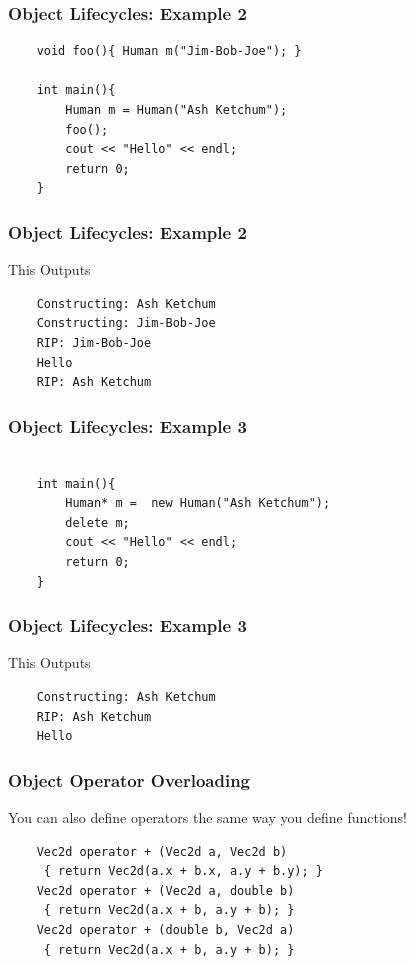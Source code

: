\documentclass{beamer}
\begin{document}
\begin{frame}[fragile]
    \frametitle{Object Lifecycles: Example 2}
    \begin{verbatim}
    void foo(){ Human m("Jim-Bob-Joe"); }

    int main(){
        Human m = Human("Ash Ketchum");
        foo();
        cout << "Hello" << endl;
        return 0;
    }
    \end{verbatim}
\end{frame}
\begin{frame}[fragile]
    \frametitle{Object Lifecycles: Example 2}
    This Outputs
    \begin{verbatim}
    Constructing: Ash Ketchum
    Constructing: Jim-Bob-Joe
    RIP: Jim-Bob-Joe
    Hello
    RIP: Ash Ketchum
    \end{verbatim}

\end{frame}


\begin{frame}[fragile]
    \frametitle{Object Lifecycles: Example 3}
    \begin{verbatim}

    int main(){
        Human* m =  new Human("Ash Ketchum");
        delete m;
        cout << "Hello" << endl;
        return 0;
    }
    \end{verbatim}
\end{frame}
\begin{frame}[fragile]
    \frametitle{Object Lifecycles: Example 3}
    This Outputs
    \begin{verbatim}
    Constructing: Ash Ketchum
    RIP: Ash Ketchum
    Hello
    \end{verbatim}

\end{frame}

\begin{frame}[fragile]
    \frametitle{Object Operator Overloading }
    You can also define operators the same way you define functions!
    \begin{verbatim}
    Vec2d operator + (Vec2d a, Vec2d b) 
     { return Vec2d(a.x + b.x, a.y + b.y); }
    Vec2d operator + (Vec2d a, double b)
     { return Vec2d(a.x + b, a.y + b); }
    Vec2d operator + (double b, Vec2d a)
     { return Vec2d(a.x + b, a.y + b); }
    \end{verbatim}

\end{frame}
\end{document}
